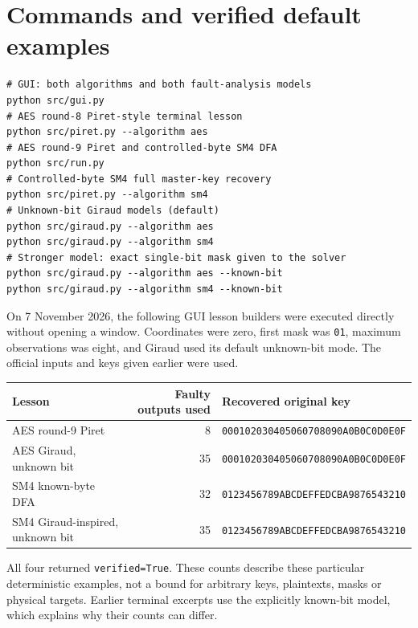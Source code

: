 \documentclass[11pt,a4paper]{report}
\newcommand{\hex}[1]{\texttt{#1}}
\begin{document}
\section{Commands and verified default examples}
\begin{lstlisting}[style=terminal]
# GUI: both algorithms and both fault-analysis models
python src/gui.py
# AES round-8 Piret-style terminal lesson
python src/piret.py --algorithm aes
# AES round-9 Piret and controlled-byte SM4 DFA
python src/run.py
# Controlled-byte SM4 full master-key recovery
python src/piret.py --algorithm sm4
# Unknown-bit Giraud models (default)
python src/giraud.py --algorithm aes
python src/giraud.py --algorithm sm4
# Stronger model: exact single-bit mask given to the solver
python src/giraud.py --algorithm aes --known-bit
python src/giraud.py --algorithm sm4 --known-bit
\end{lstlisting}
On 7 November 2026, the following GUI lesson builders were executed directly without opening a window. Coordinates were zero, first mask was \hex{01}, maximum observations was eight, and Giraud used its default unknown-bit mode. The official inputs and keys given earlier were used.
\begin{center}
\small
\begin{tabular}{p{.34\linewidth}rl}
\toprule Lesson & Faulty outputs used & Recovered original key\\\midrule
AES round-9 Piret & 8 & \hex{000102030405060708090A0B0C0D0E0F}\\
AES Giraud, unknown bit & 35 & \hex{000102030405060708090A0B0C0D0E0F}\\
SM4 known-byte DFA & 32 & \hex{0123456789ABCDEFFEDCBA9876543210}\\
SM4 Giraud-inspired, unknown bit & 35 & \hex{0123456789ABCDEFFEDCBA9876543210}\\
\bottomrule
\end{tabular}
\end{center}
All four returned \texttt{verified=True}. These counts describe these particular deterministic examples, not a bound for arbitrary keys, plaintexts, masks or physical targets. Earlier terminal excerpts use the explicitly known-bit model, which explains why their counts can differ.
\end{document}

